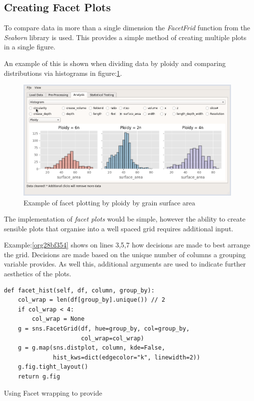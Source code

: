 \documentclass[11pt]{report}
\begin{document}
\clearpage
\subsection{Creating Facet Plots}
\label{sec:org2a6013b}

To compare data in more than a single dimension the \emph{FacetFrid} function from the \emph{Seaborn} library is used. This provides a simple method of creating multiple plots in a single figure.

An example of this is shown when dividing data by ploidy and comparing distributions via histograms in figure:\ref{fig:orgcd21146}.

\begin{figure}[htbp]
\centering
\includegraphics[width=12cm]{./images/facet_example.png}
\caption{\label{fig:orgcd21146}
Example of facet plotting by ploidy by grain surface area}
\end{figure}

The implementation of \emph{facet plots} would be simple, however the ability to create sensible plots that organise into a well spaced grid requires additional input.

Example:\ref{org28bf354} shows on lines 3,5,7 how decisions are made to best arrange the grid. Decisions are made based on the unique number of columns a grouping variable provides. As well this,  additional arguments are  used to indicate further aesthetics of the plots.

\begin{listing}[htbp]
\begin{verbatim}
def facet_hist(self, df, column, group_by):
    col_wrap = len(df[group_by].unique()) // 2
    if col_wrap < 4:
        col_wrap = None
    g = sns.FacetGrid(df, hue=group_by, col=group_by,
                      col_wrap=col_wrap)
    g = g.map(sns.distplot, column, kde=False,
              hist_kws=dict(edgecolor="k", linewidth=2))
    g.fig.tight_layout()
    return g.fig
\end{verbatim}
\caption{\label{org28bf354}
Using Facet wrapping to provide}
\end{listing}
\end{document}
